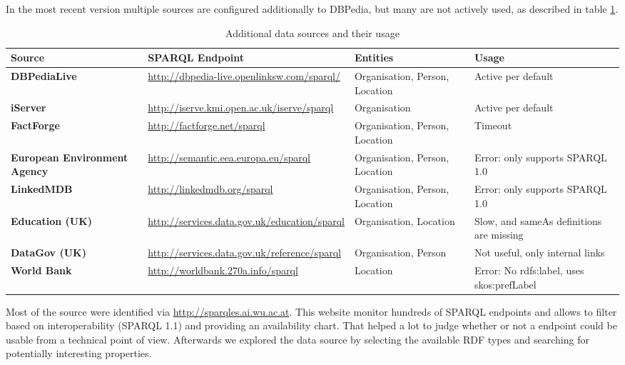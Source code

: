 \documentclass[11pt,titlepage,oneside,openany]{article}
\begin{document}
In the most recent version multiple sources are configured additionally to DBPedia, but many are not actively used, as described in table \ref{tab:sources}.
\begin{table}[ht]
	\begin{tabular*}{\textwidth}{p{}|p{}|p{} |p{3cm}}
		
		\textbf{Source} &\small \textbf{SPARQL Endpoint} & \textbf{Entities} & \textbf{Usage}  \\
		\hline 
		\textbf{DBPediaLive} &\small \url{http://dbpedia-live.openlinksw.com/sparql/} & Organisation, Person, Location  & Active per default\\
		\hline 
		\textbf{iServer} &\small \url{http://iserve.kmi.open.ac.uk/iserve/sparql} & Organisation & Active per default \\
		\hline 
		\textbf{FactForge} &\small \url{http://factforge.net/sparql} & Organisation, Person, Location & Timeout \\
		\hline 
		\textbf{European Environment Agency} &\small \url{http://semantic.eea.europa.eu/sparql} &  Organisation, Person, Location  & Error: only supports SPARQL 1.0  \\
		\hline   
		\textbf{LinkedMDB} &\small \url{http://linkedmdb.org/sparql} &  Organisation, Person, Location  & Error: only supports SPARQL 1.0 \\
		\hline 
		\textbf{Education (UK)} & \small \url{http://services.data.gov.uk/education/sparql} &  Organisation, Location  & Slow, and sameAs definitions are missing \\
		\hline 
		\textbf{DataGov (UK)} &\small \url{http://services.data.gov.uk/reference/sparql} &  Organisation, Person  & Not useful, only internal links\\
		\hline 
		\textbf{World Bank} &\small \url{http://worldbank.270a.info/sparql} &  Location & Error: No rdfs:label, uses skos:prefLabel \\
	\end{tabular*}
	\caption{Additional data sources and their usage}
	\label{tab:sources}
\end{table}

Most of the source were identified via \url{http://sparqles.ai.wu.ac.at}. This website monitor hundreds of SPARQL endpoints and allows to filter based on interoperability (SPARQL 1.1) and providing an availability chart. That helped a lot to judge whether or not a endpoint could be usable from a technical point of view. Afterwards we explored the data source by selecting the available RDF types and searching for potentially interesting properties. 
\end{document}
